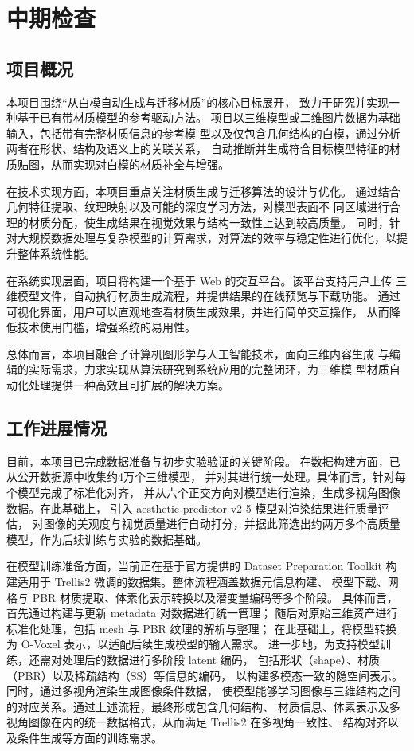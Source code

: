 \cleardoublepage
\chapter{中期检查}

\section{项目概况}
本项目围绕“从白模自动生成与迁移材质”的核心目标展开，
致力于研究并实现一种基于已有带材质模型的参考驱动方法。
项目以三维模型或二维图片数据为基础输入，包括带有完整材质信息的参考模
型以及仅包含几何结构的白模，通过分析两者在形状、结构及语义上的关联关系，
自动推断并生成符合目标模型特征的材质贴图，从而实现对白模的材质补全与增强。

在技术实现方面，本项目重点关注材质生成与迁移算法的设计与优化。
通过结合几何特征提取、纹理映射以及可能的深度学习方法，对模型表面不
同区域进行合理的材质分配，使生成结果在视觉效果与结构一致性上达到较高质量。
同时，针对大规模数据处理与复杂模型的计算需求，对算法的效率与稳定性进行优化，以提升整体系统性能。

在系统实现层面，项目将构建一个基于 Web 的交互平台。该平台支持用户上传
三维模型文件，自动执行材质生成流程，并提供结果的在线预览与下载功能。
通过可视化界面，用户可以直观地查看材质生成效果，并进行简单交互操作，
从而降低技术使用门槛，增强系统的易用性。

总体而言，本项目融合了计算机图形学与人工智能技术，面向三维内容生成
与编辑的实际需求，力求实现从算法研究到系统应用的完整闭环，为三维模
型材质自动化处理提供一种高效且可扩展的解决方案。


\section{工作进展情况}
目前，本项目已完成数据准备与初步实验验证的关键阶段。
在数据构建方面，已从公开数据源中收集约4万个三维模型，
并对其进行统一处理。具体而言，针对每个模型完成了标准化对齐，
并从六个正交方向对模型进行渲染，生成多视角图像数据。在此基础上，
引入 aesthetic-predictor-v2-5 模型对渲染结果进行质量评估，
对图像的美观度与视觉质量进行自动打分，并据此筛选出约两万多个高质量模型，作为后续训练与实验的数据基础。

在模型训练准备方面，当前正在基于官方提供的 Dataset Preparation Toolkit 
构建适用于 Trellis2 微调的数据集。整体流程涵盖数据元信息构建、
模型下载、网格与 PBR 材质提取、体素化表示转换以及潜变量编码等多个阶段。
具体而言，首先通过构建与更新 metadata 对数据进行统一管理；
随后对原始三维资产进行标准化处理，包括 mesh 与 PBR 纹理的解析与整理；
在此基础上，将模型转换为 O-Voxel 表示，以适配后续生成模型的输入需求。
进一步地，为支持模型训练，还需对处理后的数据进行多阶段 latent 编码，
包括形状（shape）、材质（PBR）以及稀疏结构（SS）等信息的编码，
以构建多模态一致的隐空间表示。同时，通过多视角渲染生成图像条件数据，
使模型能够学习图像与三维结构之间的对应关系。通过上述流程，最终形成包含几何结构、
材质信息、体素表示及多视角图像在内的统一数据格式，从而满足 Trellis2 在多视角一致性、
结构对齐以及条件生成等方面的训练需求。

